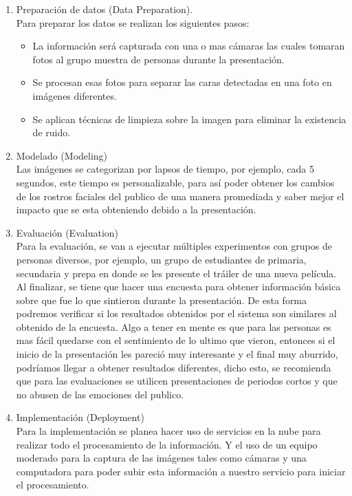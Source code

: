 \begin{enumerate}
      \item Preparación de datos (Data Preparation). \\Para preparar los datos se realizan
            los siguientes pasos:
            \begin{itemize}
                  \item La información será capturada con una o mas cámaras las cuales tomaran fotos al
                        grupo muestra de personas durante la presentación.
                  \item Se procesan esas fotos para separar las caras detectadas en una foto en
                        imágenes diferentes.
                  \item Se aplican técnicas de limpieza sobre la imagen para eliminar la existencia de
                        ruido.
            \end{itemize}

      \item Modelado (Modeling) \\Las imágenes se categorizan por lapsos de tiempo, por
            ejemplo, cada 5 segundos, este tiempo es personalizable, para así poder obtener
            los cambios de los rostros faciales del publico de una manera promediada y
            saber mejor el impacto que se esta obteniendo debido a la presentación.

      \item Evaluación (Evaluation) \\Para la evaluación, se van a ejecutar múltiples
            experimentos con grupos de personas diversos, por ejemplo, un grupo de
            estudiantes de primaria, secundaria y prepa en donde se les presente el tráiler
            de una nueva película. Al finalizar, se tiene que hacer una encuesta para
            obtener información básica sobre que fue lo que sintieron durante la
            presentación. De esta forma podremos verificar si los resultados obtenidos por
            el sistema son similares al obtenido de la encuesta. Algo a tener en mente es
            que para las personas es mas fácil quedarse con el sentimiento de lo ultimo que
            vieron, entonces si el inicio de la presentación les pareció muy interesante y
            el final muy aburrido, podríamos llegar a obtener resultados diferentes, dicho
            esto, se recomienda que para las evaluaciones se utilicen presentaciones de
            periodos cortos y que no abusen de las emociones del publico.

      \item Implementación (Deployment) \\Para la implementación se planea hacer uso de
            servicios en la nube para realizar todo el procesamiento de la información. Y
            el uso de un equipo moderado para la captura de las imágenes tales como cámaras
            y una computadora para poder subir esta información a nuestro servicio para
            iniciar el procesamiento.
\end{enumerate}


